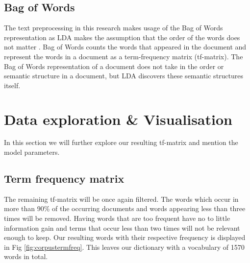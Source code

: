 \subsection{Bag of Words} \label{methodology:bagow}
The text preprocessing in this research makes usage of the Bag of Words representation as LDA makes the assumption that the order of the words does not matter \cite{Blei2010}. Bag of Words counts the words that appeared in the document and represent the words in a document as a term-frequency matrix (tf-matrix). The Bag of Words representation of a document does not take in the order or semantic structure in a document, but LDA discovers these semantic structures itself. 

\section{Data exploration \& Visualisation} \label{methodology:explo&visu}
In this section we will further explore our resulting tf-matrix and mention the model parameters.

\subsection{Term frequency matrix}
The remaining tf-matrix will be once again filtered. The words which occur in more than 90\% of the occurring documents and words appearing less than three times will be removed. Having words that are too frequent have no to little information gain and terms that occur less than two times will not be relevant enough to keep. Our resulting words with their respective frequency is displayed in Fig \ref{fig:corpustermfreq}. This leaves our dictionary with a vocabulary of 1570 words in total.

 
 
